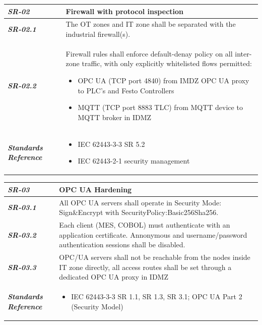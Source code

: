 \documentclass{article}
\begin{document}
\begin{tabularx}{\textwidth}{>{\bfseries}p{2.5cm} X}
    \textit{SR-02} & \textbf{Firewall with protocol inspection} \vspace{0.5em}\\
\toprule
\textit{SR-02.1} &
    The OT zones and IT zone shall be separated with the industrial firewall(s).
    \vspace{0.5em}
\\
\textit{SR-02.2} &
Firewall rules shall enforce default-denay policy on all inter-zone traffic,
with only explicitly whitelisted flows permitted:
\begin{itemize}[label=-, itemsep=0pt, topsep=2pt]
    \item OPC UA (TCP port 4840) from IMDZ OPC UA proxy to PLC's and Festo Controllers
    \item MQTT (TCP port 8883 TLC) from MQTT device to MQTT broker in IDMZ
\end{itemize} \vspace{1em}
    \\
\midrule
    \textit{Standards Reference} &
\begin{itemize}[label=-, noitemsep, topsep=0pt, leftmargin=*]
    \item IEC 62443-3-3 SR 5.2
    \item IEC 62443-2-1 security management
\end{itemize} \vspace{1em} \\ 
\end{tabularx}
\vspace{2em}

\begin{tabularx}{\textwidth}{>{\bfseries}p{2.5cm} X}
    \textit{SR-03} & \textbf{OPC UA Hardening} \vspace{0.5em}\\
\toprule
\textit{SR-03.1} &
    
    All OPC UA servers shall operate in Security Mode: Sign\&Encrypt with SecurityPolicy:Basic256Sha256.
    \vspace{0.5em}
\\
\textit{SR-03.2} &
    Each client (MES, COBOL) must authenticate with an application certificate. Annonymous and username/password authentication sessions shall be disabled.
    \vspace{0.5em}
    \\
\textit{SR-03.3} &
    OPC/UA servers shall not be reachable from the nodes inside IT zone directly, all access routes shall be set through a dedicated OPC UA proxy in IDMZ
    \vspace{0.5em}
    \\
\midrule
    \textit{Standards Reference} &
\begin{itemize}[label=-, noitemsep, topsep=0pt, leftmargin=*]
    \item IEC 62443-3-3 SR 1.1, SR 1.3, SR 3.1; OPC UA Part 2 (Security Model)
\end{itemize} \vspace{1em} \\ 
\end{tabularx}
\vspace{2em}
\end{document}
